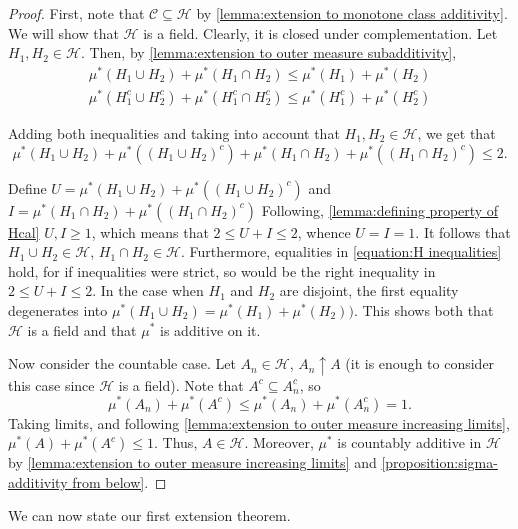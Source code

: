 \begin{proof} First, note that \(\mathcal{C}\subseteq \mathcal{H}\) by \cref{lemma:extension to
monotone class additivity}. We will show that \(\mathcal{H}\) is a field. Clearly, it
is closed under complementation. Let \(H_1,H_2\in\mathcal{H}\). Then, by
\cref{lemma:extension to outer measure subadditivity},
	\begin{equation}\label{equation:H inequalities}
		\begin{aligned} \mu^*(H_1\cup H_2)+\mu^*(H_1\cap H_2)\leq\mu^*(H_1)+\mu^*(H_2) \\ \mu^*(H_1^c\cup H_2^c)+\mu^*(H_1^c\cap H_2^c)\leq\mu^*(H_1^c)+\mu^*(H_2^c)
		\end{aligned}
	\end{equation}
	
	Adding both inequalities and taking into account that \(H_1,H_2\in\mathcal{H}\),
we get that
	\[\mu^*(H_1\cup H_2)+\mu^*((H_1\cup H_2)^c)+\mu^*(H_1\cap H_2)+\mu^*((H_1\cap H_2)^c)\leq 2.\]
	
	Define \(U=\mu^*(H_1\cup H_2)+\mu^*((H_1\cup H_2)^c)\) and
\(I=\mu^*(H_1\cap H_2)+\mu^*((H_1\cap H_2)^c)\) Following, \ref{lemma:defining
property of Hcal} \(U,I\geq 1\), which means that \(2\leq U+I\leq2\), whence
\(U=I=1\). It follows that \(H_1\cup H_2\in\mathcal{H}\), \(H_1\cap H_2\in\mathcal{H}\).
Furthermore, equalities in \eqref{equation:H inequalities} hold, for if inequalities
were strict, so would be the right inequality in \(2\leq U+I\leq2\). In the case
when \(H_1\) and \(H_2\) are disjoint, the first equality degenerates into
\(\mu^*(H_1\cup H_2)=\mu^*(H_1)+\mu^*(H_2))\). This shows both that \(\mathcal{H}\) is
a field and that \(\mu^{*}\) is additive on it.
	
Now consider the countable case. Let \(A_n\in\mathcal{H}\), \(A_n\uparrow A\)
(it is enough to consider this case since \(\mathcal{H}\) is a field). Note that
\(A^c\subseteq A_n^c\), so
	\[\mu^*(A_n)+\mu^*(A^c)\leq\mu^*(A_n)+\mu^*(A_n^c)=1.\] Taking limits, and
following \cref{lemma:extension to outer measure increasing limits},
\(\mu^*(A)+\mu^*(A^c)\leq 1\). Thus, \(A\in\mathcal{H}\). Moreover, \(\mu^*\) is
countably additive in \(\mathcal{H}\) by \cref{lemma:extension to outer measure
increasing limits} and \cref{proposition:sigma-additivity from below}.
\end{proof}
We can now state our first extension theorem.

